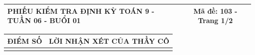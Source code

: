 \documentclass[12pt,a4paper]{article}
\begin{document}
\newpage

\noindent
\begin{tabularx}{\linewidth}{|X|c|}
\hline
\textbf{PHIẾU KIỂM TRA ĐỊNH KỲ TOÁN 9 - TUẦN 06 - BUỔI 01} & \textbf{Mã đề: 103 - Trang 1/2} \\
\hline
\end{tabularx}

\vspace{1.0mm}

\noindent
\begin{tabularx}{\linewidth}{|p{3.2cm}|X|}
\hline
\centering\textbf{ĐIỂM SỐ} & \centering\textbf{LỜI NHẬN XÉT CỦA THẦY CÔ} \tabularnewline
\hline
\rule{0pt}{1.8cm} & \tabularnewline
\hline
\end{tabularx}
\end{document}
